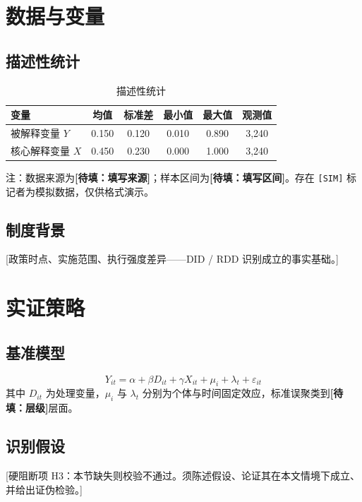 \documentclass[11pt,a4paper]{article}
\numberwithin{equation}{section}
\theoremstyle{plain}
\newcommand{\cneed}[1]{\textbf{[待填：#1]}}
\begin{document}
\section{数据与变量}
\subsection{描述性统计}
\begin{table}[htbp]
\centering
\begin{threeparttable}
\caption{描述性统计}
\label{tab:desc}
\begin{tabular}{lccccc}
\toprule
变量 & 均值 & 标准差 & 最小值 & 最大值 & 观测值 \\
\midrule
被解释变量 $Y$ & 0.150 & 0.120 & 0.010 & 0.890 & 3,240 \\
核心解释变量 $X$ & 0.450 & 0.230 & 0.000 & 1.000 & 3,240 \\
\bottomrule
\end{tabular}
\begin{tablenotes}
\footnotesize
\item 注：数据来源为\cneed{填写来源}；样本区间为\cneed{填写区间}。存在 \texttt{[SIM]} 标记者为模拟数据，仅供格式演示。
\end{tablenotes}
\end{threeparttable}
\end{table}

\subsection{制度背景}
[政策时点、实施范围、执行强度差异——DID / RDD 识别成立的事实基础。]

\section{实证策略}
\subsection{基准模型}
\begin{equation}\label{eq:did}
Y_{it}=\alpha+\beta D_{it}+\gamma X_{it}+\mu_i+\lambda_t+\varepsilon_{it}
\end{equation}
其中 $D_{it}$ 为处理变量，$\mu_i$ 与 $\lambda_t$ 分别为个体与时间固定效应，标准误聚类到\cneed{层级}层面。

\subsection{识别假设}
[硬阻断项 H3：本节缺失则校验不通过。须陈述假设、论证其在本文情境下成立、并给出证伪检验。]
\end{document}
